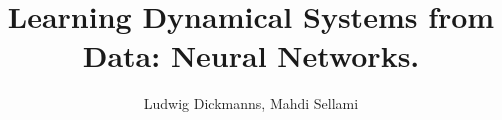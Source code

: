 \usepackage[utf8]{inputenc}
\usepackage{packages}
\usepackage{beamermods}

\usepackage{tikz}
\usepackage{pgfplots}
\usepackage{url}
\usepackage{algorithm2e}
\usepackage{svg}
\usepackage{amsmath}

\usepackage{subfig}


\author[L. Dickmanns, M. Sellami]{Ludwig Dickmanns, Mahdi Sellami}
\title[Learning Dynamical Systems with NNs]{Learning Dynamical Systems from Data: Neural Networks.}



\date{}


\usepackage{pgfpages}
\usepackage{ifthen}
\newif\ifsolution%

\makeatletter
\let\@@magyar@captionfix\relax
\makeatother
